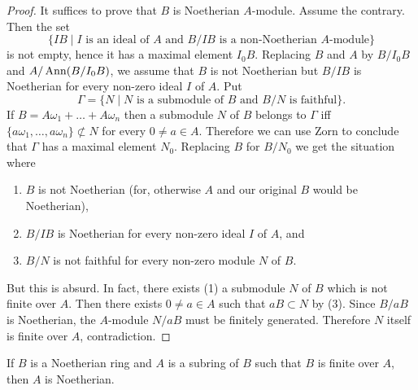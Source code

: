 \documentclass[../main]{subfiles}
\begin{document}
\begin{proof}
It suffices to prove that $B$ is Noetherian $A$-module. Assume the contrary. Then the set \[\{IB \mid I \text { is an ideal of } A \text { and } B/IB \text { is a non-Noetherian } A\text{-module}\}\] is not empty, hence it has a maximal element $I_0 B$. Replacing $B$ and $A$ by $B/I_0 B$ and $A/\operatorname{Ann}(B/I_0 B)$, we assume that $B$ is not Noetherian but $B/IB$ is Noetherian for every non-zero ideal $I$ of $A$. Put \[\Gamma = \{N \mid N \text { is a submodule of } B \text { and } B/N \text { is faithful}\}.\] If $B = A \omega_1 + \ldots + A \omega_n$ then a submodule $N$ of $B$ belongs to $\Gamma$ iff \newline$\{a \omega_1, \ldots, a \omega_n\} \not \subset N$ for every $0 \ne a \in A$. Therefore we can use Zorn to conclude that $\Gamma$ has a maximal element $N_0$. Replacing $B$ for $B/N_0$ we get the situation where 
\begin{enumerate}[label = (\arabic*)]
    \item $B$ is not Noetherian (for, otherwise $A$ and our original $B$ would be Noetherian),
    \item $B/IB$ is Noetherian for every non-zero ideal $I$ of $A$, and
    \item $B/N$ is not faithful for every non-zero module $N$ of $B$. 
\end{enumerate}
But this is absurd. In fact, there exists (1) a submodule $N$ of $B$ which is not finite over $A$. Then there exists $0 \ne a \in A$ such that $a B \subset N$ by (3). Since $B/a B$ is Noetherian, the $A$-module $N/a B$ must be finitely generated. Therefore $N$ itself is finite over $A$, contradiction.
\end{proof}

\begin{corollary}[Eakin]
If $B$ is a Noetherian ring and $A$ is a subring of $B$ such that $B$ is finite over $A$, then $A$ is Noetherian.
\end{corollary}
\end{document}
